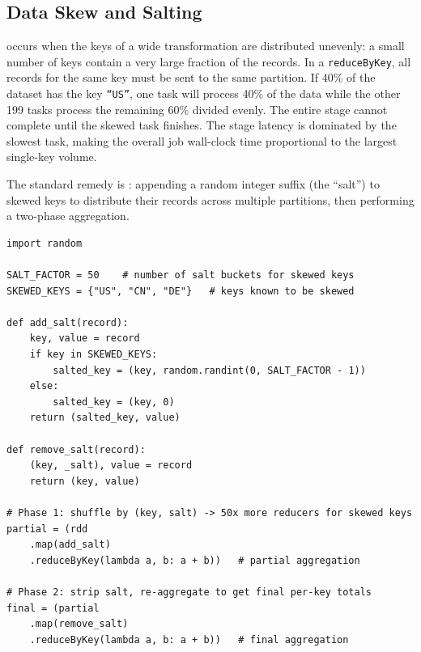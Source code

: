 \subsection{Data Skew and Salting}
\label{subsec:skew}

 occurs when the keys of a wide transformation are
distributed unevenly: a small number of keys contain a very large
fraction of the records. In a \texttt{reduceByKey}, all records for
the same key must be sent to the same partition. If 40\% of the dataset
has the key \texttt{``US''}, one task will process 40\% of the data
while the other 199 tasks process the remaining 60\% divided evenly.
The entire stage cannot complete until the skewed task finishes. The
stage latency is dominated by the slowest task, making the overall
job wall-clock time proportional to the largest single-key volume.

The standard remedy is : appending a random integer suffix
(the ``salt'') to skewed keys to distribute their records across multiple
partitions, then performing a two-phase aggregation.

\begin{lstlisting}[style=pyspark, caption={Salting to resolve data skew in a PySpark RDD}]
import random

SALT_FACTOR = 50    # number of salt buckets for skewed keys
SKEWED_KEYS = {"US", "CN", "DE"}   # keys known to be skewed

def add_salt(record):
    key, value = record
    if key in SKEWED_KEYS:
        salted_key = (key, random.randint(0, SALT_FACTOR - 1))
    else:
        salted_key = (key, 0)
    return (salted_key, value)

def remove_salt(record):
    (key, _salt), value = record
    return (key, value)

# Phase 1: shuffle by (key, salt) -> 50x more reducers for skewed keys
partial = (rdd
    .map(add_salt)
    .reduceByKey(lambda a, b: a + b))   # partial aggregation

# Phase 2: strip salt, re-aggregate to get final per-key totals
final = (partial
    .map(remove_salt)
    .reduceByKey(lambda a, b: a + b))   # final aggregation
\end{lstlisting}

